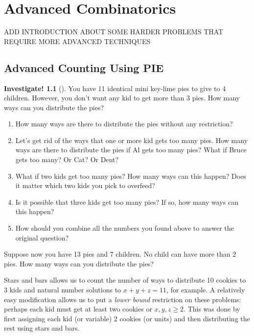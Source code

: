 \documentclass[10pt,]{book}
\theoremstyle{plain}
\theoremstyle{definition}
\theoremstyle{definition}
\theoremstyle{definition}
\newtheorem{investigation}[project]{Investigate!}
\theoremstyle{definition}
\numberwithin{equation}{chapter}
\begin{document}
\chapter[{Advanced Combinatorics}]{Advanced Combinatorics}\label{ch_advanced}
\hypertarget{p-938}{}%
ADD INTRODUCTION ABOUT SOME HARDER PROBLEMS THAT REQUIRE MORE ADVANCED TECHNIQUES%
\typeout{************************************************}
\typeout{************************************************}
\section[{Advanced Counting Using PIE}]{Advanced Counting Using PIE}\label{sec_advPIE}
\begin{investigation}[]\label{investigation-7}
\hypertarget{p-939}{}%
You have 11 identical mini key-lime pies to give to 4 children. However, you don't want any kid to get more than 3 pies. How many ways can you distribute the pies? %
\begin{enumerate}
\item\hypertarget{li-118}{}\hypertarget{p-940}{}%
How many ways are there to distribute the pies without any restriction?%
\item\hypertarget{li-119}{}\hypertarget{p-941}{}%
Let's get rid of the ways that one or more kid gets too many pies. How many ways are there to distribute the pies if Al gets too many pies? What if Bruce gets too many? Or Cat? Or Dent?%
\item\hypertarget{li-120}{}\hypertarget{p-942}{}%
What if two kids get too many pies? How many ways can this happen? Does it matter which two kids you pick to overfeed?%
\item\hypertarget{li-121}{}\hypertarget{p-943}{}%
Is it possible that three kids get too many pies? If so, how many ways can this happen?%
\item\hypertarget{li-122}{}\hypertarget{p-944}{}%
How should you combine all the numbers you found above to answer the original question?%
\end{enumerate}
%
\par
\hypertarget{p-945}{}%
Suppose now you have 13 pies and 7 children. No child can have more than 2 pies. How many ways can you distribute the pies?%
\end{investigation}
\hypertarget{p-946}{}%
Stars and bars allows us to count the number of ways to distribute 10 cookies to 3 kids and natural number solutions to \(x+y+z = 11\), for example. A relatively easy modification allows us to put a \emph{lower bound} restriction on these problems: perhaps each kid must get at least two cookies or \(x,y,z \ge 2\). This was done by first assigning each kid (or variable) 2 cookies (or units) and then distributing the rest using stars and bars.%
\end{document}
